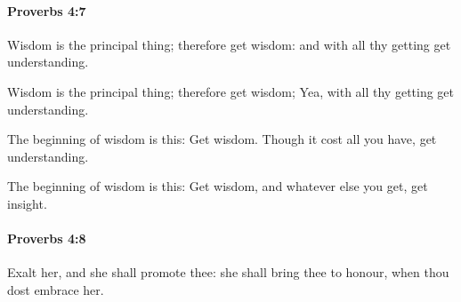 		\paragraph{Proverbs 4:7} %
			\label{PROVERBS-4-7}

			Wisdom is the principal thing; therefore get wisdom: and with all thy getting get understanding.

			\begin{versebox}
					\item[BHS] 
					\item[ASV] Wisdom is the principal thing; therefore get wisdom; Yea, with all thy getting get understanding.
					\item[NIV] The beginning of wisdom is this: Get wisdom. Though it cost all you have, get understanding.
					\item[NRSV] The beginning of wisdom is this: Get wisdom, and whatever else you get, get insight.
			\end{versebox}

		\paragraph{Proverbs 4:8} %
			\label{PROVERBS-4-8}

			Exalt her, and she shall promote thee: she shall bring thee to honour, when thou dost embrace her.

